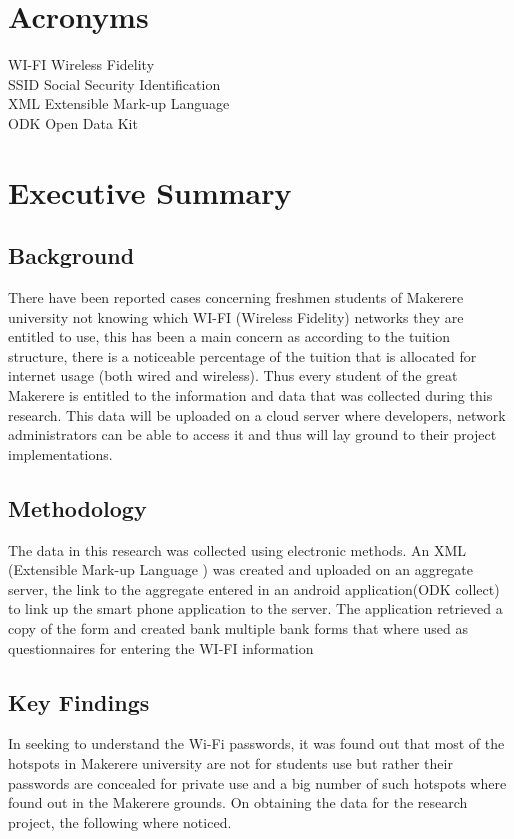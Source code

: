 \documentclass[14pt, a4paper]{article}
\begin{document}
			\section{Acronyms}
WI-FI 		Wireless Fidelity\\
SSID 		Social Security Identification\\
XML		Extensible Mark-up Language \\
ODK		Open Data Kit\\			


			\section {Executive Summary}
				\subsection{Background}
There have been reported cases concerning freshmen students of Makerere  university not knowing which WI-FI (Wireless Fidelity) networks they are entitled to use, this has been a main concern as according to the tuition structure, there is a noticeable percentage of the tuition that is allocated for internet usage (both wired and wireless). Thus every student of the great Makerere is entitled to the information and data that was collected during this research. This data will be uploaded on a cloud server where developers, network administrators can be able to access it and thus will lay ground to their project implementations. 

				\subsection{Methodology}

The data in this research was collected using electronic methods. An XML (Extensible Mark-up Language ) was created and uploaded on an aggregate server, the link to the aggregate entered in an android application(ODK collect) to link up the smart phone application to the server. The application retrieved a copy of the form and created bank multiple bank forms that where used as questionnaires for entering the WI-FI information

				\subsection{Key Findings}
In seeking to understand the Wi-Fi passwords, it was found out that most of the hotspots in Makerere university are not for students use but rather their passwords are concealed for private use and a big number of such hotspots where found out in the Makerere grounds. On obtaining the data for the research project, the following where noticed.\\
\end{document}
